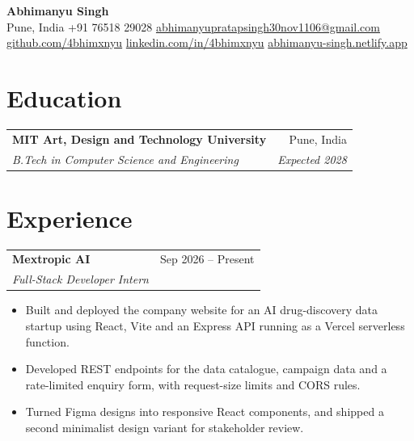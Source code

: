 \documentclass[a4paper,10pt]{article}
\makeatletter
\newcommand{\entry}[4]{%
  \begin{tabularx}{\linewidth}{@{}X r@{}}
    \textbf{#1} & #2 \\
    \textit{#3} & \textit{#4} \\
  \end{tabularx}\vspace{-3pt}}
\makeatother
\begin{document}
\begin{center}
  {\LARGE\bfseries Abhimanyu Singh}\\[3pt]
  Pune, India \textbar{}
  +91 76518 29028 \textbar{}
  \href{mailto:abhimanyupratapsingh30nov1106@gmail.com}{abhimanyupratapsingh30nov1106@gmail.com}\\[1pt]
  \href{https://github.com/4bhimxnyu}{github.com/4bhimxnyu} \textbar{}
  \href{https://www.linkedin.com/in/4bhimxnyu/}{linkedin.com/in/4bhimxnyu} \textbar{}
  \href{https://abhimanyu-singh.netlify.app}{abhimanyu-singh.netlify.app}
\end{center}
\vspace{-6pt}

\section{Education}
\entry{MIT Art, Design and Technology University}{Pune, India}
      {B.Tech in Computer Science and Engineering}{Expected 2028}

\section{Experience}

\entry{Mextropic AI}{Sep 2026 -- Present}
      {Full-Stack Developer Intern}{}
\begin{itemize}
  \item Built and deployed the company website for an AI drug-discovery data startup using React, Vite and an Express API running as a Vercel serverless function.
  \item Developed REST endpoints for the data catalogue, campaign data and a rate-limited enquiry form, with request-size limits and CORS rules.
  \item Turned Figma designs into responsive React components, and shipped a second minimalist design variant for stakeholder review.
\end{itemize}
\end{document}
